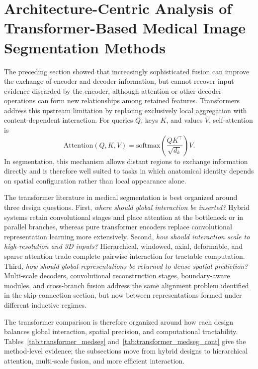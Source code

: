 \documentclass[5p,times,authoryear]{elsarticle}
\begin{document}
\section{Architecture-Centric Analysis of Transformer-Based Medical Image Segmentation Methods}


The preceding section showed that increasingly sophisticated fusion can improve the exchange of encoder and decoder information, but cannot recover input evidence discarded by the encoder, although attention or other decoder operations can form new relationships among retained features. Transformers address this upstream limitation by replacing exclusively local aggregation with content-dependent interaction. For queries $Q$, keys $K$, and values $V$, self-attention is
\begin{equation}
\mathrm{Attention}(Q,K,V) =
\mathrm{softmax}\left(\frac{QK^\top}{\sqrt{d_k}}\right)V.
\end{equation}
In segmentation, this mechanism allows distant regions to exchange information directly and is therefore well suited to tasks in which anatomical identity depends on spatial configuration rather than local appearance alone.

The transformer literature in medical segmentation is best organized around three design questions. First, \emph{where should global interaction be inserted?} Hybrid systems retain convolutional stages and place attention at the bottleneck or in parallel branches, whereas pure transformer encoders replace convolutional representation learning more extensively. Second, \emph{how should interaction scale to high-resolution and 3D inputs?} Hierarchical, windowed, axial, deformable, and sparse attention trade complete pairwise interaction for tractable computation. Third, \emph{how should global representations be returned to dense spatial prediction?} Multi-scale decoders, convolutional reconstruction stages, boundary-aware modules, and cross-branch fusion address the same alignment problem identified in the skip-connection section, but now between representations formed under different inductive regimes.

The transformer comparison is therefore organized around how each design balances global interaction, spatial precision, and computational tractability. Tables~\ref{tab:transformer_medseg} and~\ref{tab:transformer_medseg_cont} give the method-level evidence; the subsections move from hybrid designs to hierarchical attention, multi-scale fusion, and more efficient interaction.
\end{document}
